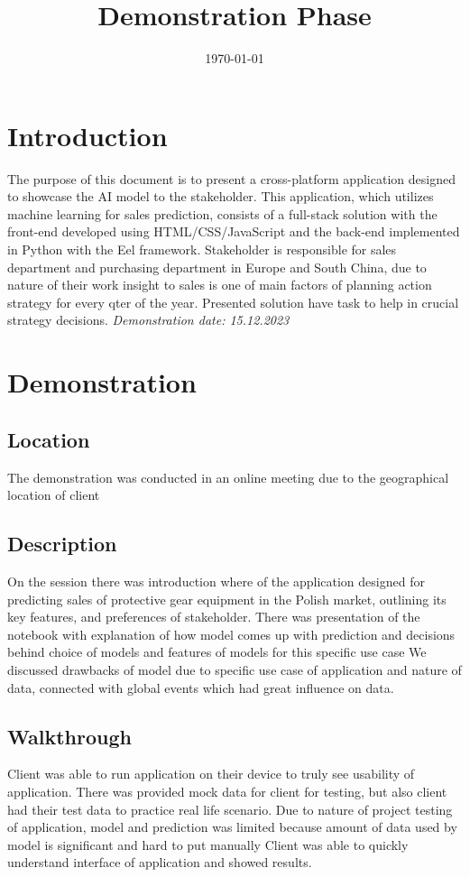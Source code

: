 \documentclass{article}
\begin{document}
\title{Demonstration Phase}
\date{\today}
\maketitle

\newpage
\tableofcontents
\newpage

\section{Introduction}
The purpose of this document is to present a cross-platform application designed to showcase the AI model to the stakeholder. This application, which utilizes machine learning for sales prediction, consists of a full-stack solution with the front-end developed using HTML/CSS/JavaScript and the back-end implemented in Python with the Eel framework. Stakeholder is responsible for sales department and purchasing department in Europe and South China, due to nature of their work insight to sales is one of main factors of planning action strategy for every qter of the year. Presented solution have task to help in crucial strategy decisions.
\smallbreak
\textit{Demonstration date: 15.12.2023}
\section{Demonstration}
\subsection{Location}
The demonstration was conducted in an online meeting due to the geographical location of client
\subsection{Description}
On the session there was introduction where of the application designed for predicting sales of protective gear equipment in the Polish market, outlining its key features, and preferences of stakeholder. There was presentation of the notebook with explanation of how model comes up with prediction and decisions behind choice of models and features of models for this specific use case We discussed drawbacks of model due to specific use case of application and nature of data, connected with global events which had great influence on data. 

\subsection{Walkthrough}
Client was able to run application on their device to truly see  usability of application. There was provided mock data for client for testing, but also client had their test data to practice real life scenario. Due to nature of project testing of application, model and prediction was limited because amount of data used by model is significant and hard to put manually 
Client was able to quickly understand interface of application and showed results.
\end{document}
